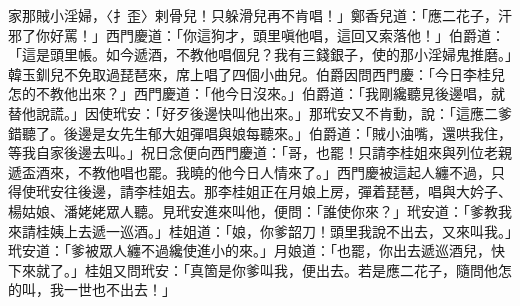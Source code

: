 \begin{showcontents}{}
家那賊小淫婦，〈扌歪〉剌骨兒！只躲滑兒再不肯唱！」鄭香兒道：「應二花子，汗邪了你好罵！」西門慶道：「你這狗才，頭里嗔他唱，這回又索落他！」伯爵道：「這是頭里帳。如今遞酒，不教他唱個兒？我有三錢銀子，使的那小淫婦鬼推磨。」韓玉釧兒不免取過琵琶來，席上唱了四個小曲兒。伯爵因問西門慶：「今日李桂兒怎的不教他出來？」西門慶道：「他今日沒來。」伯爵道：「我剛纔聽見後邊唱，就替他說謊。」因使玳安：「好歹後邊快叫他出來。」那玳安又不肯動，說：「這應二爹錯聽了。後邊是女先生郁大姐彈唱與娘每聽來。」伯爵道：「賊小油嘴，還哄我住，等我自家後邊去叫。」祝日念便向西門慶道：「哥，也罷！只請李桂姐來與列位老親遞盃酒來，不教他唱也罷。我曉的他今日人情來了。」西門慶被這起人纏不過，只得使玳安往後邊，請李桂姐去。那李桂姐正在月娘上房，彈着琵琶，唱與大妗子、楊姑娘、潘姥姥眾人聽。見玳安進來叫他，便問：「誰使你來？」玳安道：「爹教我來請桂姨上去遞一巡酒。」桂姐道：「娘，你爹韶刀！頭里我說不出去，又來叫我。」玳安道：「爹被眾人纏不過纔使進小的來。」月娘道：「也罷，你出去遞巡酒兒，快下來就了。」桂姐又問玳安：「真箇是你爹叫我，便出去。若是應二花子，隨問他怎的叫，我一世也不出去！」


\end{showcontents}
